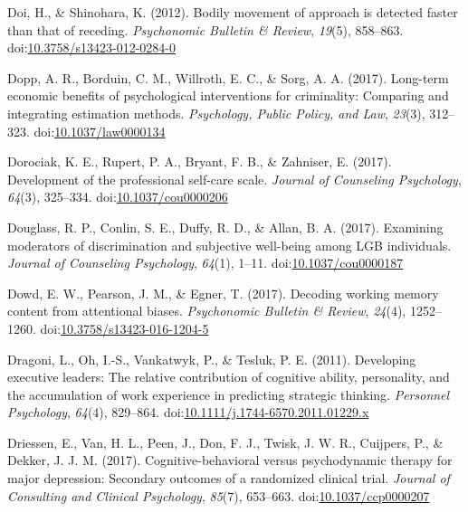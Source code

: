 \documentclass[english,man]{apa6}
\theoremstyle{definition}
\theoremstyle{definition}
\theoremstyle{definition}
\theoremstyle{remark}
\begin{document}
\hypertarget{ref-Doi2012}{}
Doi, H., \& Shinohara, K. (2012). Bodily movement of approach is
detected faster than that of receding. \emph{Psychonomic Bulletin \&
Review}, \emph{19}(5), 858--863.
doi:\href{https://doi.org/10.3758/s13423-012-0284-0}{10.3758/s13423-012-0284-0}

\hypertarget{ref-Dopp2017}{}
Dopp, A. R., Borduin, C. M., Willroth, E. C., \& Sorg, A. A. (2017).
Long-term economic benefits of psychological interventions for
criminality: Comparing and integrating estimation methods.
\emph{Psychology, Public Policy, and Law}, \emph{23}(3), 312--323.
doi:\href{https://doi.org/10.1037/law0000134}{10.1037/law0000134}

\hypertarget{ref-Dorociak2017}{}
Dorociak, K. E., Rupert, P. A., Bryant, F. B., \& Zahniser, E. (2017).
Development of the professional self-care scale. \emph{Journal of
Counseling Psychology}, \emph{64}(3), 325--334.
doi:\href{https://doi.org/10.1037/cou0000206}{10.1037/cou0000206}

\hypertarget{ref-Douglass2017}{}
Douglass, R. P., Conlin, S. E., Duffy, R. D., \& Allan, B. A. (2017).
Examining moderators of discrimination and subjective well-being among
LGB individuals. \emph{Journal of Counseling Psychology}, \emph{64}(1),
1--11. doi:\href{https://doi.org/10.1037/cou0000187}{10.1037/cou0000187}

\hypertarget{ref-Dowd2017}{}
Dowd, E. W., Pearson, J. M., \& Egner, T. (2017). Decoding working
memory content from attentional biases. \emph{Psychonomic Bulletin \&
Review}, \emph{24}(4), 1252--1260.
doi:\href{https://doi.org/10.3758/s13423-016-1204-5}{10.3758/s13423-016-1204-5}

\hypertarget{ref-Dragoni2011}{}
Dragoni, L., Oh, I.-S., Vankatwyk, P., \& Tesluk, P. E. (2011).
Developing executive leaders: The relative contribution of cognitive
ability, personality, and the accumulation of work experience in
predicting strategic thinking. \emph{Personnel Psychology},
\emph{64}(4), 829--864.
doi:\href{https://doi.org/10.1111/j.1744-6570.2011.01229.x}{10.1111/j.1744-6570.2011.01229.x}

\hypertarget{ref-Driessen2017}{}
Driessen, E., Van, H. L., Peen, J., Don, F. J., Twisk, J. W. R.,
Cuijpers, P., \& Dekker, J. J. M. (2017). Cognitive-behavioral versus
psychodynamic therapy for major depression: Secondary outcomes of a
randomized clinical trial. \emph{Journal of Consulting and Clinical
Psychology}, \emph{85}(7), 653--663.
doi:\href{https://doi.org/10.1037/ccp0000207}{10.1037/ccp0000207}
\end{document}
